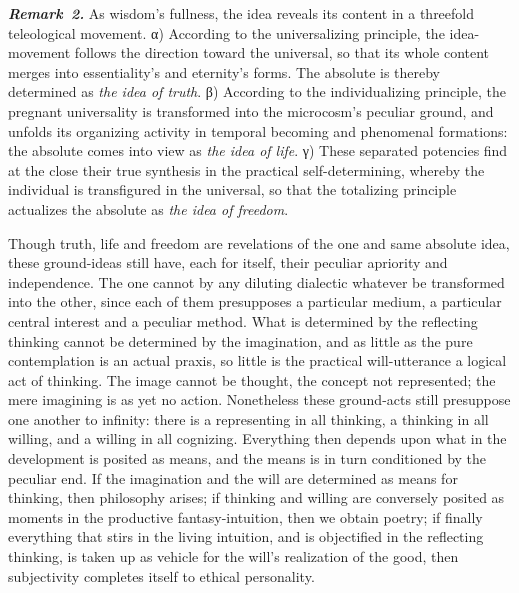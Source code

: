 \documentclass[12pt]{book}
\newcommand{\anm}[1]{\emph{\textbf{Remark~#1.}}}
\begin{document}
\anm{2} As wisdom's fullness, the idea reveals its content in a threefold
teleological movement. α) According to the universalizing principle, the
idea-movement follows the direction toward the universal, so that its whole
content merges into essentiality's and eternity's forms. The absolute is
thereby determined as \emph{the idea of truth}. β) According to the
individualizing principle, the pregnant universality is transformed into the
microcosm's peculiar ground, and unfolds its organizing activity in temporal
becoming and phenomenal formations: the absolute comes into view as
\emph{the idea of life}. γ) These separated potencies find at the close
their true synthesis in the practical self-determining, whereby the
individual is transfigured in the universal, so that the totalizing
principle actualizes the absolute as \emph{the idea of freedom}.

Though truth, life and freedom are revelations of the one and same absolute
idea, these ground-ideas still have, each for itself, their peculiar
apriority and independence. The one cannot by any diluting dialectic
whatever be transformed into the other, since each of them presupposes a
particular medium, a particular central interest and a peculiar method. What
is determined by the reflecting thinking cannot be determined by the
imagination, and as little as the pure contemplation is an actual praxis, so
little is the practical will-utterance a logical act of thinking. The image
cannot be thought, the concept not represented; the mere imagining is as yet
no action. Nonetheless these ground-acts still presuppose one another to
infinity: there is a representing in all thinking, a thinking in all
willing, and a willing in all cognizing. Everything then depends upon what
in the development is posited as means, and the means is in turn conditioned
by the peculiar end. If the imagination and the will are determined as means
for thinking, then philosophy arises; if thinking and willing are conversely
posited as moments in the productive fantasy-intuition, then we obtain
poetry; if finally everything that stirs in the living intuition, and is
objectified in the reflecting thinking, is taken up as vehicle for the
will's realization of the good, then subjectivity completes itself to
ethical personality.
\end{document}
